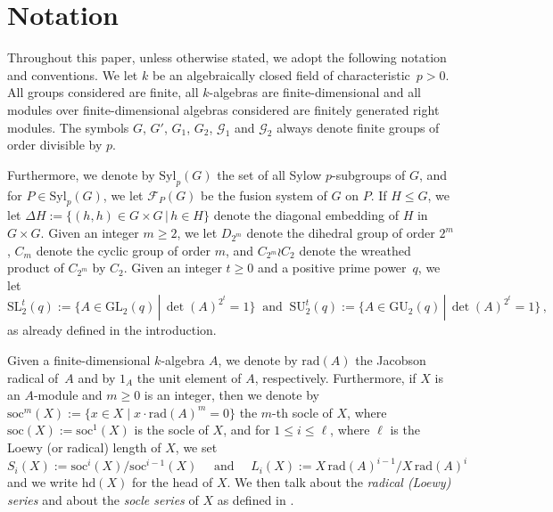\documentclass[12pt,a4paper]{amsart}
\theoremstyle{plain}\newtheorem{Theorem}{Theorem}[section]
\theoremstyle{plain}\newtheorem{Conjecture}[Theorem]{Conjecture}
\theoremstyle{plain}\newtheorem{Corollary}[Theorem]{Corollary}
\theoremstyle{plain}\newtheorem{Lemma}[Theorem]{Lemma}
\theoremstyle{plain}\newtheorem{Proposition}[Theorem]{Proposition}
\theoremstyle{definition}\newtheorem{Definition}[Theorem]{Definition}
\theoremstyle{definition}\newtheorem{Example}[Theorem]{Example}
\theoremstyle{definition}\newtheorem{Examples}[Theorem]{Examples}
\theoremstyle{definition}\newtheorem{Remark}[Theorem]{Remark}
\theoremstyle{definition}\newtheorem{Question}[Theorem]{Question}
\theoremstyle{definition}\newtheorem{Notation}[Theorem]{Notation}
\theoremstyle{definition}\newtheorem{Hypothesis}[Theorem]{Hypothesis}
\theoremstyle{definition}\newtheorem{Assumption}[Theorem]{Assumption}
\theoremstyle{definition}\newtheorem{Strategy}[Theorem]{Strategy}
\theoremstyle{definition}\newtheorem{Contents}[Theorem]{Contents}
\theoremstyle{definition}\newtheorem{Computations}[Theorem]{Computations}
\theoremstyle{definition}\newtheorem{Equivalences}[Theorem]{Equivalences}
\theoremstyle{definition}\newtheorem{Notation/Definition}[Theorem]{Notation/Definition}
\theoremstyle{definition}\newtheorem{noth}[Theorem]{}
\theoremstyle{plain}\newtheorem{Step}[Theorem]{Step}
\def\Syl{\mathrm{Syl}}
\def\rad{\mathrm{rad}}
\def\soc{\mathrm{soc}} \def\tenOS{\otimes_{\mathcal{O}S}} \def\Tr{\mathrm{Tr}}
\begin{document}
\section{Notation}\label{sec:nota}
Throughout this paper, unless otherwise stated, we adopt the following notation and 
conventions.  We let $k$ be an algebraically closed field of characteristic~{\color{black}$p>0$}. 
All groups considered are finite,  all $k$-algebras are finite-dimensional 
and all modules over finite-dimensional algebras considered are finitely generated right modules.
The symbols $G$, $G'$, $G_{1}$, $G_{2}$,  $\mathcal G_{1}$ and  $\mathcal G_{2}$ 
always denote finite groups of order divisible by $p$.
\par  
Furthermore, we denote by ${\mathrm{Syl}}_p(G)$ the set of all Sylow $p$-subgroups of $G$, and 
for $P\in\Syl_p(G)$, we let $\mathcal F_P(G)$ be the fusion system of $G$ on $P$.
If $H\leq G$, we let $\Delta H:=\{(h, h)\in G\times G\,|\, h\in H\}$ denote the diagonal 
embedding of $H$ in $G\times G$. 
Given an integer $m\geq 2$, we let $D_{2^m}$ denote the dihedral group of order $2^m$,  
$C_m$ denote the cyclic group of order $m$, and  $C_{2^m}\wr C_2$ denote the 
wreathed product of $C_{2^m}$ by $C_2$.
Given an integer $t\geq 0$ and a positive prime power~$q$, we let 
$${\mathrm{SL}}^t_2(q):=\{A\in{\mathrm{GL}}_2(q)\,|\,
\det(A)^{2^t}=1 \} \ \text{ and } \ {\mathrm{SU}}^t_2(q)
:=\{A\in{\mathrm{GU}}_2(q)\,|\, \det(A)^{2^t}=1 \}\,,$$
as already defined in the introduction.
\par
Given  a finite-dimensional $k$-algebra $A$, we denote by $\rad(A)$ the Jacobson radical  of~$A$
and by $1_A$ the unit element of $A$, respectively.
Furthermore, if $X$ is an $A$-module and  $m\geq 0$ is an integer, then we denote by $\soc^m(X):={\{x\in X \mid x\cdot\rad(A)^m=0\}}$  
the $m$-th socle of $X$, where $\soc(X):=\soc^1(X)$ is the socle of $X$, and for $1\leq i\leq \ell$, 
where $\ell$ is the Loewy (or radical) length of $X$, we set 
$$S_i(X):=\soc^i(X)/\soc^{i-1}(X)\quad\text{ and }\quad L_i(X):= X\,{\mathrm{rad}}(A)^{i-1}/X\,{\mathrm{rad}}(A)^i$$
and we write $\text{hd}(X)$ for the head of $X$. 
We then talk about the \emph{radical (Loewy) series} and about the \emph{socle series} of $X$ as defined in 
\cite[Chap. I \S8]{Lan83}. 
\end{document}
